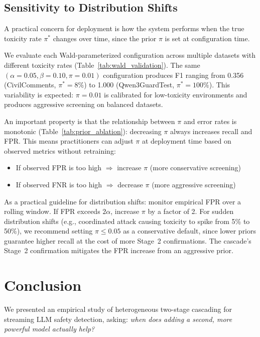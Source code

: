\documentclass[acmtjournal, acmnowidth]{acmart}
\theoremstyle{definition}
\begin{document}
\subsection{Sensitivity to Distribution Shifts}
\label{sec:dist_shift}

A practical concern for deployment is how the system performs when the true toxicity rate $\pi^*$ changes over time, since the prior $\pi$ is set at configuration time.

We evaluate each Wald-parameterized configuration across multiple datasets with different toxicity rates (Table~\ref{tab:wald_validation}). The same $(\alpha{=}0.05, \beta{=}0.10, \pi{=}0.01)$ configuration produces F1 ranging from 0.356 (CivilComments, $\pi^*{=}8\%$) to 1.000 (Qwen3GuardTest, $\pi^*{=}100\%$). This variability is expected: $\pi{=}0.01$ is calibrated for low-toxicity environments and produces aggressive screening on balanced datasets.

An important property is that the relationship between $\pi$ and error rates is monotonic (Table~\ref{tab:prior_ablation}): decreasing $\pi$ always increases recall and FPR. This means practitioners can adjust $\pi$ at deployment time based on observed metrics without retraining:
\begin{itemize}
    \item If observed FPR is too high $\Rightarrow$ increase $\pi$ (more conservative screening)
    \item If observed FNR is too high $\Rightarrow$ decrease $\pi$ (more aggressive screening)
\end{itemize}

As a practical guideline for distribution shifts: monitor empirical FPR over a rolling window. If FPR exceeds $2\alpha$, increase $\pi$ by a factor of 2. For sudden distribution shifts (e.g., coordinated attack causing toxicity to spike from 5\% to 50\%), we recommend setting $\pi \leq 0.05$ as a conservative default, since lower priors guarantee higher recall at the cost of more Stage~2 confirmations. The cascade's Stage~2 confirmation mitigates the FPR increase from an aggressive prior.

\section{Conclusion}

We presented an empirical study of heterogeneous two-stage cascading for streaming LLM safety detection, asking: \textit{when does adding a second, more powerful model actually help?}
\end{document}
